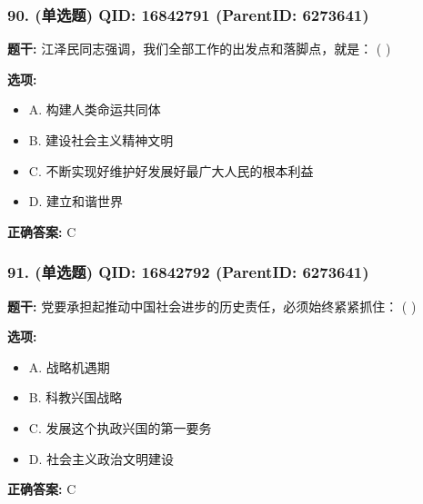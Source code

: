 \documentclass[12pt,UTF8]{ctexart}
\begin{document}
\subsubsection*{90. (单选题) \small QID: 16842791 (ParentID: 6273641)}

\textbf{题干:}
江泽民同志强调，我们全部工作的出发点和落脚点，就是： ( )



\textbf{选项:}
\begin{itemize}[leftmargin=*]

  \item A. 构建人类命运共同体

  \item B. 建设社会主义精神文明

  \item C. 不断实现好维护好发展好最广大人民的根本利益

  \item D. 建立和谐世界

\end{itemize}

\textbf{正确答案:}
C

\vspace{0.3em}\hrulefill\vspace{0.7em}

\subsubsection*{91. (单选题) \small QID: 16842792 (ParentID: 6273641)}

\textbf{题干:}
党要承担起推动中国社会进步的历史责任，必须始终紧紧抓住： ( )



\textbf{选项:}
\begin{itemize}[leftmargin=*]

  \item A. 战略机遇期

  \item B. 科教兴国战略

  \item C. 发展这个执政兴国的第一要务

  \item D. 社会主义政治文明建设

\end{itemize}

\textbf{正确答案:}
C

\vspace{0.3em}\hrulefill\vspace{0.7em}
\end{document}
